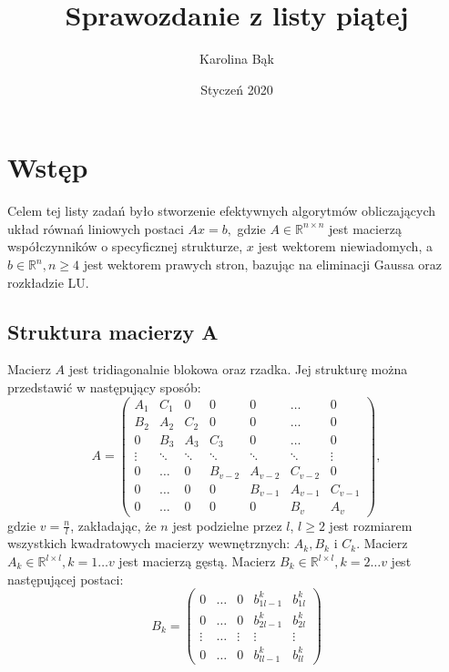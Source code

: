 \documentclass{article}
\title{Sprawozdanie z listy piątej}
\author{Karolina Bąk}
\date{Styczeń 2020}
\begin{document}
\maketitle

\section{Wstęp}
Celem tej listy zadań było stworzenie efektywnych algorytmów obliczających układ równań liniowych 
postaci $Ax = b,$ gdzie $A \in \mathbb R^{n \times n}$ jest macierzą współczynników o specyficznej strukturze, $x$ jest wektorem niewiadomych, 
a $b \in \mathbb R^n, n \geqslant 4$ jest wektorem prawych stron, bazując na eliminacji Gaussa oraz rozkładzie LU.

\subsection{Struktura macierzy A}
Macierz $A$ jest tridiagonalnie blokowa oraz rzadka. Jej strukturę można przedstawić 
w następujący sposób:
$$
A = 
\begin{pmatrix}
    A_1 & C_1 & 0 & 0 & 0 & \ldots & 0 \\
    B_2 & A_2 & C_2 & 0 & 0 & \ldots & 0 \\
    0 & B_3 & A_3 & C_3 & 0 & \ldots & 0 \\
    \vdots & \ddots & \ddots & \ddots & \ddots & \ddots & \vdots \\
    0 & \ldots & 0 & B_{v-2} & A_{v-2} & C_{v-2} & 0 \\
    0 & \ldots & 0 & 0 & B_{v-1} & A_{v-1} & C_{v-1} \\
    0 & \ldots & 0 & 0 & 0 & B_v & A_v
\end{pmatrix},
$$
gdzie $v = \frac{n}{l}$, zakładając, że $n$ jest podzielne przez $l$, $l \geqslant 2$ 
jest rozmiarem wszystkich kwadratowych macierzy wewnętrznych: $A_k, B_k$ i $C_k$. 
\newline
\newline
Macierz $A_k \in \mathbb R^{l \times l}, k = 1 \ldots v$ jest macierzą gęstą. Macierz 
$B_k \in \mathbb R^{l \times l}, k = 2 \ldots v$ jest następującej postaci:
$$
B_k = 
\begin{pmatrix}
    0 & \ldots & 0 & b_{1 l-1}^k & b_{1 l}^k \\
    0 & \ldots & 0 & b_{2 l-1}^k & b_{2 l}^k \\
    \vdots & \ldots & \vdots & \vdots & \vdots \\
    0 & \ldots & 0 & b_{l l-1}^k & b_{l l}^k 
\end{pmatrix}
$$
\end{document}
